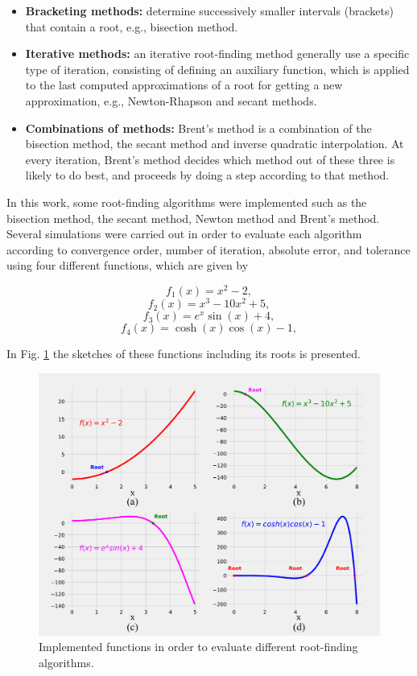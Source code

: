 \documentclass[11pt]{exam}
\begin{document}
\begin{itemize}
	\item \textbf{Bracketing methods:} determine successively smaller intervals (brackets) that contain a root, e.g., bisection method.
	\item \textbf{Iterative methods:} an iterative root-finding method generally use a specific type of iteration, consisting of defining an auxiliary function, which is applied to the last computed approximations of a root for getting a new approximation, e.g., Newton-Rhapson and secant methods.
	\item \textbf{Combinations of methods:} Brent's method is a combination of the bisection method, the secant method and inverse quadratic interpolation. At every iteration, Brent's method decides which method out of these three is likely to do best, and proceeds by doing a step according to that method. 
\end{itemize}

In this work, some root-finding algorithms were implemented such as the bisection method, the secant method, Newton method and Brent's method. Several simulations were carried out in order to evaluate each algorithm according to convergence order, number of iteration, absolute error, and tolerance using four different functions, which are given by

\begin{equation}\label{f1}
f_1(x)=x^2-2,
\end{equation}
\begin{equation}\label{f2}
f_2(x)=x^3-10x^2+5,
\end{equation}
\begin{equation}\label{f3}
f_3(x)=e^x\sin(x)+4,
\end{equation}
\begin{equation}\label{f4}
f_4(x)=\cosh(x)\cos(x)-1,
\end{equation}

In Fig. \ref{fig:function} the sketches of these functions including its roots is presented.

\begin{figure}[!h]
	\centering
	\includegraphics[width=12cm]{img/Functions.pdf}\caption{Implemented functions in order to evaluate different root-finding algorithms.}\label{fig:function}
\end{figure}
\end{document}
